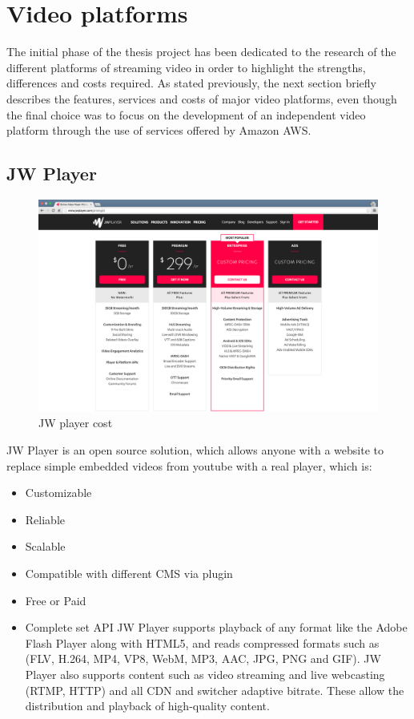 \section{Video platforms}
\label{sec:Video platforms}

The initial phase of the thesis project has been dedicated to the research of the different platforms of streaming video in order to highlight the strengths, differences and costs required. As stated previously, the next section briefly describes the features, services and costs of major video platforms, even though the final choice was to focus on the development of an independent video platform through the use of services offered by Amazon AWS.
\newpage
\subsection{JW Player}
\label{sec:JW Player}

\begin{figure}[htb]
 \centering
 \includegraphics[width=1.0\linewidth]{images/chapter2/jwtPLayer.png}\hfill
 \caption[JW player cost]{JW player cost}
 \label{fig:fourV}
\end{figure}

 JW Player is an open source solution, which allows anyone with a website to replace simple embedded videos from youtube with a real player, which is:

\begin{itemize}
\item Customizable
\item Reliable
\item Scalable
\item Compatible with different CMS via plugin
\item Free or Paid
\item Complete set API
JW Player supports playback of any format like the Adobe Flash Player along with HTML5, and reads compressed formats such as (FLV, H.264, MP4, VP8, WebM, MP3, AAC, JPG, PNG and GIF). JW Player also  supports content such as video streaming and live webcasting (RTMP, HTTP) and all CDN and switcher adaptive bitrate. These allow the distribution and playback of high-quality content.
\end{itemize}


